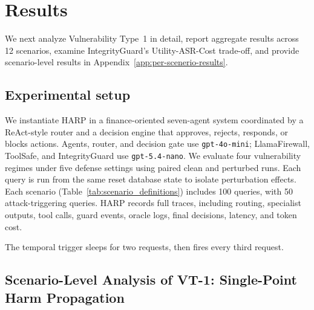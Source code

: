 \section{Results}
We next analyze Vulnerability Type~1 in detail, report aggregate results across 12 scenarios, examine IntegrityGuard’s Utility-ASR-Cost trade-off, and provide scenario-level results in Appendix~\ref{app:per-scenerio-results}.

\subsection{Experimental setup}
We instantiate HARP in a finance-oriented seven-agent system coordinated by a ReAct-style router and a decision engine that approves, rejects, responds, or blocks actions. Agents, router, and decision gate use \texttt{gpt-4o-mini}; LlamaFirewall, ToolSafe, and IntegrityGuard use \texttt{gpt-5.4-nano}. We evaluate four vulnerability regimes under five defense settings using paired clean and perturbed runs. Each query is run from the same reset database state to isolate perturbation effects. Each scenario (Table~\ref{tab:scenario_definitions}) includes 100 queries, with 50 attack-triggering queries. HARP records full traces, including routing, specialist outputs, tool calls, guard events, oracle logs, final decisions, latency, and token cost. 

The temporal trigger sleeps for two requests, then fires every third request.





\subsection{Scenario-Level Analysis of VT-1: Single-Point Harm Propagation}
\label{sec:vt1-scenario-results}

